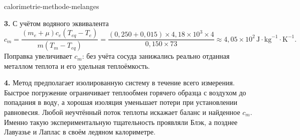 \begin{exo}{calorimetrie-methode-melanges}
\begin{solution}
\textbf{3.} С учётом водяного эквивалента
\[
c_m=\frac{(m_e+\mu)c_e(T_{eq}-T_e)}{m(T_m-T_{eq})}
=\frac{(0{,}250+0{,}015)\times4{,}18\times10^3\times4}{0{,}150\times73}
\approx4{,}05\times10^2\,\text{J}\!\cdot\!\text{kg}^{-1}\!\cdot\!\text{K}^{-1}.
\]
Поправка увеличивает $c_m$: без учёта сосуда занижались реально отданная металлом теплота и его удельная теплоёмкость.

\textbf{4.} Метод предполагает изолированную систему в течение всего измерения. Быстрое погружение ограничивает теплообмен горячего образца с воздухом до попадания в воду, а хорошая изоляция уменьшает потери при установлении равновесия. Любой неучтённый поток теплоты искажает баланс и найденное $c_m$. Именно такую экспериментальную тщательность проявляли Блэк, а позднее Лавуазье и Лаплас в своём ледяном калориметре.
\end{solution}
\end{exo}

